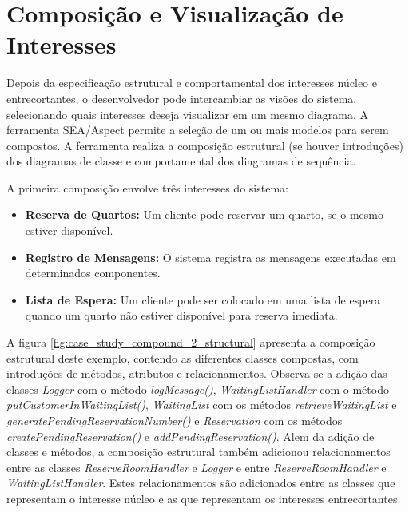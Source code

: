\section{Composição e Visualização de Interesses}

Depois da especificação estrutural e comportamental dos interesses núcleo e entrecortantes, o desenvolvedor pode intercambiar as visões do sistema,
selecionando quais interesses deseja visualizar em um mesmo diagrama. A ferramenta SEA/Aspect permite a seleção de um ou mais modelos para serem
compostos. A ferramenta realiza a composição estrutural (se houver introduções) dos diagramas de classe e comportamental dos diagramas de sequência.

A primeira composição envolve três interesses do sistema:

\begin{itemize}
  \item \textbf{Reserva de Quartos:} Um cliente pode reservar um quarto, se o mesmo estiver disponível.
  \item \textbf{Registro de Mensagens:} O sistema registra as mensagens executadas em determinados componentes.
  \item \textbf{Lista de Espera:} Um cliente pode ser colocado em uma lista de espera quando um quarto não estiver disponível para reserva imediata.
\end{itemize}

A figura \ref{fig:case_study_compound_2_structural} apresenta a composição estrutural deste exemplo, contendo as diferentes classes compostas, com
introduções de métodos, atributos e relacionamentos. Observa-se a adição das classes \textit{Logger} com o método \textit{logMessage()},
\textit{WaitingListHandler} com o método \textit{putCustomerInWaitingList()}, \textit{WaitingList} com os métodos \textit{retrieveWaitingList} e
\textit{generatePendingReservationNumber()} e \textit{Reservation} com os métodos \textit{createPendingReservation()} e
\textit{addPendingReservation()}. Alem da adição de classes e métodos, a composição estrutural também adicionou relacionamentos entre as classes
\textit{ReserveRoomHandler} e \textit{Logger} e entre \textit{ReserveRoomHandler} e \textit{WaitingListHandler}. Estes relacionamentos são adicionados
entre as classes que representam o interesse núcleo e as que representam os interesses entrecortantes.

